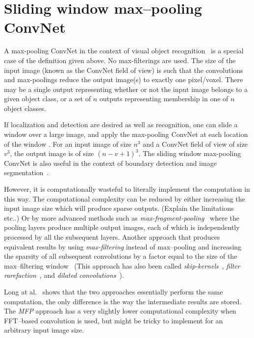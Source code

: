 \documentclass[conference]{./IEEEtran/IEEEtran}
\begin{document}
\section{Sliding window max--pooling ConvNet}

  \label{sec:sliding-window}

  A max-pooling ConvNet in the context of visual object
  recognition~\cite{krizhevsky2012imagenet} is a special case of the
  definition given above.  No max-filterings are used.  The size of
  the input image (known as the ConvNet field of view) is such that
  the convolutions and max-poolings reduce the output image(s) to
  exactly one pixel/voxel.  There may be a single output representing
  whether or not the input image belongs to a given object class, or a
  set of $n$ outputs representing membership in one of $n$ object
  classes.

  If localization and detection are desired as well as recognition,
  one can slide a window over a large image, and apply the max-pooling
  ConvNet at each location of the window
  \cite{sermanet2013overfeat}. For an input image of size $n^3$ and a
  ConvNet field of view of size $v^3$, the output image is of size
  $(n-v+1)^3$.  The sliding window max-pooling ConvNet is also useful
  in the context of boundary detection and image
  segmentation~\cite{ciresan2012deep}.

  However, it is computationally wasteful to literally implement the
  computation in this way.  The computational complexity can be
  reduced by either increasing the input image size which will produce
  sparse outputs. (Explain the limitations etc..) Or by more advanced
  methods such as
  \emph{max-fragment-pooling}~\cite{giusti2013fast,masci2013fast}
  where the pooling layers produce multiple output images, each of
  which is independently processed by all the subsequent layers.
  Another approach that produces equivalent results by using
  \emph{max-filtering} instead of max--pooling and increasing the
  sparsity of all subsequent convolutions by a factor equal to the
  size of the max--filtering window~\cite{zlateski2015znn} (This
  approach has also been called
  \emph{skip-kernels}~\cite{sermanet2013overfeat}, \emph{filter
    rarefaction}~\cite{long2015fully}, and \emph{dilated
    convolutions}~\cite{yu2015multi}).

  Long at al.~\cite{long2015fully} shows that the two approaches
  essentially perform the same computation, the only difference is the
  way the intermediate results are stored.  The \emph{MFP} approach
  has a very slightly lower computational complexity when FFT--based
  convolution is used, but might be tricky to implement for an
  arbitrary input image size.
\end{document}
